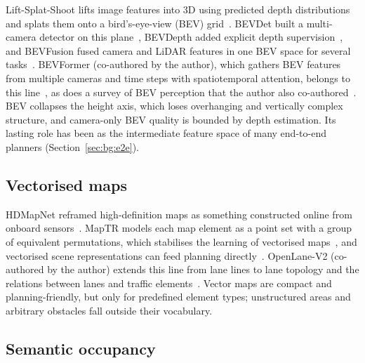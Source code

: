 Lift-Splat-Shoot lifts image features into 3D using predicted depth distributions and splats them onto a bird's-eye-view (BEV) grid~\cite{philion2020lss}. BEVDet built a multi-camera detector on this plane~\cite{huang2021bevdet}, BEVDepth added explicit depth supervision~\cite{li2023bevdepth}, and BEVFusion fused camera and LiDAR features in one BEV space for several tasks~\cite{liu2023bevfusion}. BEVFormer (co-authored by the author), which gathers BEV features from multiple cameras and time steps with spatiotemporal attention, belongs to this line~\cite{li2022bevformer}, as does a survey of BEV perception that the author also co-authored~\cite{li2023bevdevils}. BEV collapses the height axis, which loses overhanging and vertically complex structure, and camera-only BEV quality is bounded by depth estimation. Its lasting role has been as the intermediate feature space of many end-to-end planners (Section~\ref{sec:bg:e2e}).

\subsection{Vectorised maps}

HDMapNet reframed high-definition maps as something constructed online from onboard sensors~\cite{li2022hdmapnet}. MapTR models each map element as a point set with a group of equivalent permutations, which stabilises the learning of vectorised maps~\cite{liao2023maptr}, and vectorised scene representations can feed planning directly~\cite{jiang2023vad}. OpenLane-V2 (co-authored by the author) extends this line from lane lines to lane topology and the relations between lanes and traffic elements~\cite{wang2023openlanev2}. Vector maps are compact and planning-friendly, but only for predefined element types; unstructured areas and arbitrary obstacles fall outside their vocabulary.

\subsection{Semantic occupancy}

